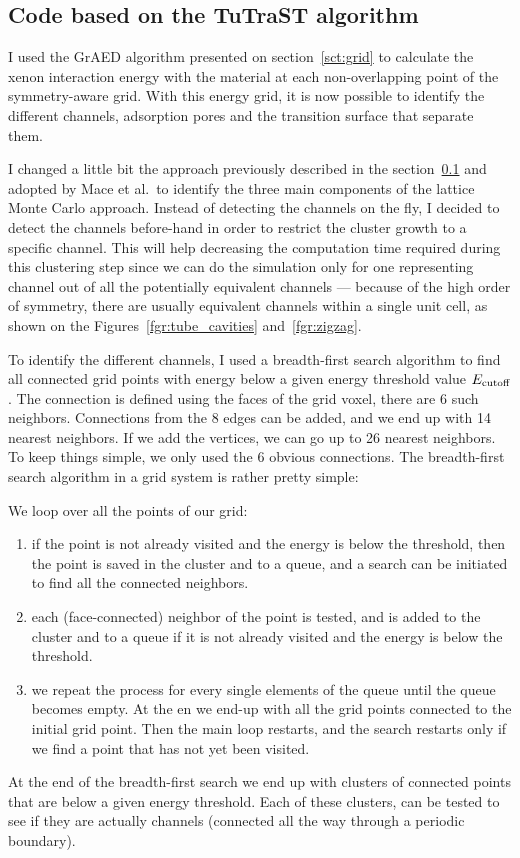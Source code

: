 \documentclass[main]{subfiles}
\begin{document}
\subsection{Code based on the TuTraST algorithm}\label{sct:tutrast}

I used the GrAED algorithm presented on section~\ref{sct:grid} to calculate the xenon interaction energy with the material at each non-overlapping point of the symmetry-aware grid. With this energy grid, it is now possible to identify the different channels, adsorption pores and the transition surface that separate them. 

I changed a little bit the approach previously described in the section~\ref{sct:tutrast} and adopted by Mace et al.\ to identify the three main components of the lattice Monte Carlo approach. Instead of detecting the channels on the fly, I decided to detect the channels before-hand in order to restrict the cluster growth to a specific channel. This will help decreasing the computation time required during this clustering step since we can do the simulation only for one representing channel out of all the potentially equivalent channels --- because of the high order of symmetry, there are usually equivalent channels within a single unit cell, as shown on the Figures~\ref{fgr:tube_cavities} and~\ref{fgr:zigzag}. 

To identify the different channels, I used a breadth-first search algorithm to find all connected grid points with energy below a given energy threshold value $E_{\text{cutoff}}$. The connection is defined using the faces of the grid voxel, there are 6 such neighbors. Connections from the 8 edges can be added, and we end up with 14 nearest neighbors. If we add the vertices, we can go up to 26 nearest neighbors. To keep things simple, we only used the 6 obvious connections. The breadth-first search algorithm in a grid system is rather pretty simple:

We loop over all the points of our grid:
  \begin{enumerate}
    \item if the point is not already visited and the energy is below the threshold, then the point is saved in the cluster and to a queue, and a search can be initiated to find all the connected neighbors. 
    \item each (face-connected) neighbor of the point is tested, and is added to the cluster and to a queue if it is not already visited and the energy is below the threshold.
    \item we repeat the process for every single elements of the queue until the queue becomes empty. At the en we end-up with all the grid points connected to the initial grid point. Then the main loop restarts, and the search restarts only if we find a point that has not yet been visited.
  \end{enumerate}
At the end of the breadth-first search we end up with clusters of connected points that are below a given energy threshold. Each of these clusters, can be tested to see if they are actually channels (connected all the way through a periodic boundary). 
\end{document}
